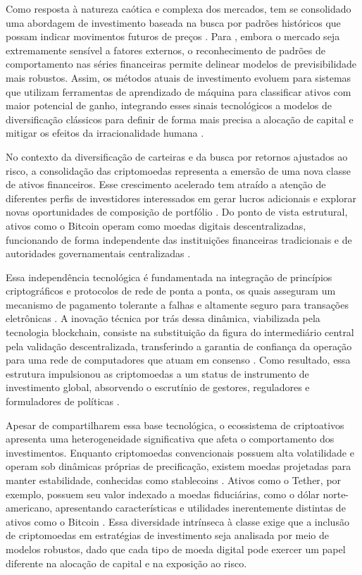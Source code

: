 Como resposta à natureza caótica e complexa dos mercados, tem se consolidado uma abordagem de investimento baseada na busca por padrões históricos que possam indicar movimentos futuros de preços \cite{paiva2019decision}. Para , embora o mercado seja extremamente sensível a fatores externos, o reconhecimento de padrões de comportamento nas séries financeiras permite delinear modelos de previsibilidade mais robustos. Assim, os métodos atuais de investimento evoluem para sistemas que utilizam ferramentas de aprendizado de máquina para classificar ativos com maior potencial de ganho, integrando esses sinais tecnológicos a modelos de diversificação clássicos para definir de forma mais precisa a alocação de capital e mitigar os efeitos da irracionalidade humana \cite{paiva2019decision}.

No contexto da diversificação de carteiras e da busca por retornos ajustados ao risco, a consolidação das criptomoedas representa a emersão de uma nova classe de ativos financeiros. Esse crescimento acelerado tem atraído a atenção de diferentes perfis de investidores interessados em gerar lucros adicionais e explorar novas oportunidades de composição de portfólio \cite{charfeddine2020investigating}. Do ponto de vista estrutural, ativos como o Bitcoin operam como moedas digitais descentralizadas, funcionando de forma independente das instituições financeiras tradicionais e de autoridades governamentais centralizadas \cite{umar2021bitcoin}.

Essa independência tecnológica é fundamentada na integração de princípios criptográficos e protocolos de rede de ponta a ponta, os quais asseguram um mecanismo de pagamento tolerante a falhas e altamente seguro para transações eletrônicas \cite{ahmed2020risk}. A inovação técnica por trás dessa dinâmica, viabilizada pela tecnologia blockchain, consiste na substituição da figura do intermediário central pela validação descentralizada, transferindo a garantia de confiança da operação para uma rede de computadores que atuam em consenso \cite{charfeddine2020investigating}. Como resultado, essa estrutura impulsionou as criptomoedas a um status de instrumento de investimento global, absorvendo o escrutínio de gestores, reguladores e formuladores de políticas \cite{ahmed2020risk}.

Apesar de compartilharem essa base tecnológica, o ecossistema de criptoativos apresenta uma heterogeneidade significativa que afeta o comportamento dos investimentos. Enquanto criptomoedas convencionais possuem alta volatilidade e operam sob dinâmicas próprias de precificação, existem moedas projetadas para manter estabilidade, conhecidas como stablecoins \cite{goodell2021diversifying}. Ativos como o Tether, por exemplo, possuem seu valor indexado a moedas fiduciárias, como o dólar norte-americano, apresentando características e utilidades inerentemente distintas de ativos como o Bitcoin \cite{goodell2021diversifying}. Essa diversidade intrínseca à classe exige que a inclusão de criptomoedas em estratégias de investimento seja analisada por meio de modelos robustos, dado que cada tipo de moeda digital pode exercer um papel diferente na alocação de capital e na exposição ao risco.

